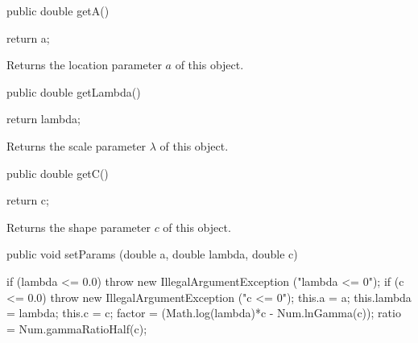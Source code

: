 \begin{htmlonly}
\end{htmlonly}
\begin{code}

   public double getA()\begin{hide} {
      return a;
   }\end{hide}
\end{code}
  \begin{tabb} Returns the location parameter $a$ of this object.
  \end{tabb}
\begin{htmlonly}
\end{htmlonly}
\begin{code}

   public double getLambda()\begin{hide} {
      return lambda;
   }\end{hide}
\end{code}
  \begin{tabb} Returns the scale parameter $\lambda$ of this object.
  \end{tabb}
\begin{htmlonly}
\end{htmlonly}
\begin{code}

   public double getC()\begin{hide} {
      return c;
   }\end{hide}
\end{code}
  \begin{tabb} Returns the shape parameter $c$ of this object.
  \end{tabb}
\begin{htmlonly}
\end{htmlonly}
\begin{code}

    public void setParams (double a, double lambda, double c)\begin{hide} {
      if (lambda <= 0.0)
         throw new IllegalArgumentException ("lambda <= 0");
      if (c <= 0.0)
         throw new IllegalArgumentException ("c <= 0");
      this.a = a;
      this.lambda = lambda;
      this.c = c;
      factor = (Math.log(lambda)*c - Num.lnGamma(c));
      ratio = Num.gammaRatioHalf(c);
    } \end{hide}
\end{code}
